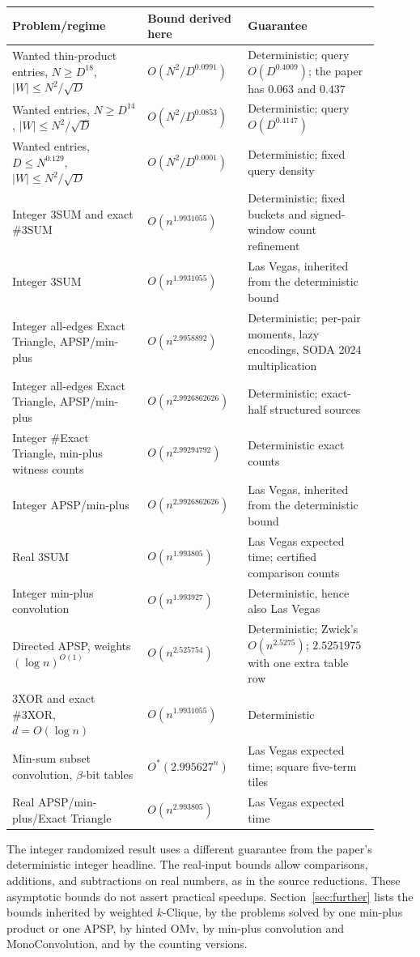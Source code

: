 \documentclass[11pt]{article}
\begin{document}
\begin{center}
\begin{tabular}{@{}p{0.34\linewidth}p{0.23\linewidth}p{0.33\linewidth}@{}}
\toprule
Problem/regime & Bound derived here & Guarantee \\
\midrule
Wanted thin-product entries, $N\ge D^{18}$,
$|W|\le N^2/\sqrt D$ & $O(N^2/D^{0.0991})$ & Deterministic; query $O(D^{0.4009})$; the paper has $0.063$ and $0.437$ \\
Wanted entries, $N\ge D^{14}$,
$|W|\le N^2/\sqrt D$ & $O(N^2/D^{0.0853})$ & Deterministic; query $O(D^{0.4147})$ \\
Wanted entries, $D\le N^{0.129}$,
$|W|\le N^2/\sqrt D$ & $O(N^2/D^{0.0001})$ & Deterministic; fixed query density \\
Integer 3SUM and exact \#3SUM & $O(n^{1.9931055})$ & Deterministic; fixed buckets and signed-window count refinement \\
Integer 3SUM & $O(n^{1.9931055})$ & Las Vegas, inherited from the deterministic bound \\
Integer all-edges Exact Triangle, APSP/min-plus & $O(n^{2.9958892})$ & Deterministic; per-pair moments, lazy encodings, SODA 2024 multiplication \\
Integer all-edges Exact Triangle, APSP/min-plus & $O(n^{2.9926862626})$ & Deterministic; exact-half structured sources \\
Integer \#Exact Triangle, min-plus witness counts & $O(n^{2.99294792})$ & Deterministic exact counts \\
Integer APSP/min-plus & $O(n^{2.9926862626})$ & Las Vegas, inherited from the deterministic bound \\
Real 3SUM & $O(n^{1.993805})$ & Las Vegas expected time; certified comparison counts \\
Integer min-plus convolution & $O(n^{1.993927})$ & Deterministic, hence also Las Vegas \\
Directed APSP, weights $(\log n)^{O(1)}$ & $O(n^{2.525754})$ & Deterministic; Zwick's $O(n^{2.5275})$; $2.5251975$ with one extra table row \\
3XOR and exact \#3XOR, $d=O(\log n)$ & $O(n^{1.9931055})$ & Deterministic \\
Min-sum subset convolution, $\beta$-bit tables & $O^*(2.995627^n)$ & Las Vegas expected time; square five-term tiles \\
Real APSP/min-plus/Exact Triangle & $O(n^{2.993805})$ & Las Vegas expected time \\
\bottomrule
\end{tabular}
\end{center}
The integer randomized result uses a different guarantee from the paper's
deterministic integer headline. The real-input bounds allow comparisons,
additions, and subtractions on real numbers, as in the source reductions.
These asymptotic bounds do not assert practical speedups.
Section~\ref{sec:further} lists the bounds inherited by weighted $k$-Clique,
by the problems solved by one min-plus product or one APSP, by hinted OMv,
by min-plus convolution and MonoConvolution, and by the counting versions.
\end{document}
